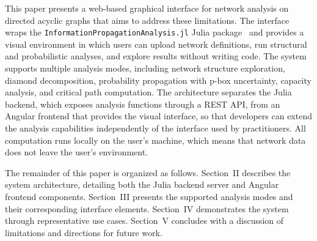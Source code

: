 \documentclass[conference]{IEEEtran}
\begin{document}
This paper presents a web-based graphical interface for network analysis on directed acyclic graphs that aims to address these limitations. The interface wraps the \texttt{InformationPropagationAnalysis.jl} Julia package~\cite{infoprop2024} and provides a visual environment in which users can upload network definitions, run structural and probabilistic analyses, and explore results without writing code. The system supports multiple analysis modes, including network structure exploration, diamond decomposition, probability propagation with p-box uncertainty, capacity analysis, and critical path computation. The architecture separates the Julia backend, which exposes analysis functions through a REST API, from an Angular frontend that provides the visual interface, so that developers can extend the analysis capabilities independently of the interface used by practitioners. All computation runs locally on the user's machine, which means that network data does not leave the user's environment.

The remainder of this paper is organized as follows. Section~II describes the system architecture, detailing both the Julia backend server and Angular frontend components. Section~III presents the supported analysis modes and their corresponding interface elements. Section~IV demonstrates the system through representative use cases. Section~V concludes with a discussion of limitations and directions for future work.
\end{document}
